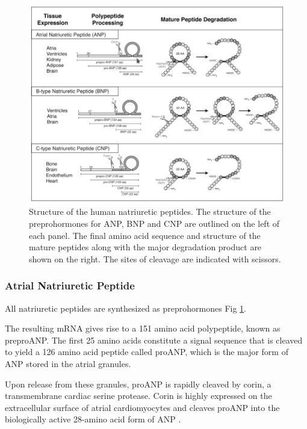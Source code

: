 \documentclass[14pt,a4paper,onecolumn]{extarticle}
\begin{document}
\begin{figure}

    \centering

    \includegraphics[scale=0.4]{../../images/NP_structure.png}

    \caption{Structure of the human natriuretic peptides. The structure of the preprohormones for ANP, BNP and CNP are outlined on the left of each panel. The final amino acid sequence and structure of the mature peptides along with the major degradation product are shown on the right. The sites of cleavage are indicated with scissors.}

    \label{NP_structure}

\end{figure}



\subsubsection{Atrial Natriuretic Peptide}



All natriuretic peptides are synthesized as preprohormones Fig \ref{NP_structure}. %

The resulting mRNA gives rise to a 151 amino acid polypeptide, known as preproANP. The first 25 amino acids constitute a signal sequence that is cleaved to yield a 126 amino acid peptide called proANP, which is the major form of ANP stored in the atrial granules. %

Upon release from these granules, proANP is rapidly cleaved by corin, a transmembrane cardiac serine protease. Corin is highly expressed on the extracellular surface of atrial cardiomyocytes and cleaves proANP into the biologically active 28-amino acid form of ANP \citep{Yan2000}. %
\end{document}
